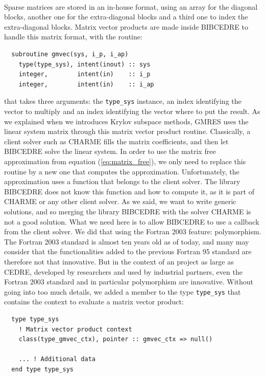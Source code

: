       \paragraph{}
      Sparse matrices are stored in an in-house format, using an array for the diagonal blocks, another one for the extra-diagonal blocks and a third one to index the extra-diagonal blocks.
      Matrix vector products are made inside BIBCEDRE to handle this matrix format, with the routine:
\begin{verbatim}
  subroutine gmvec(sys, i_p, i_ap)
    type(type_sys), intent(inout) :: sys
    integer,        intent(in)    :: i_p
    integer,        intent(in)    :: i_ap
\end{verbatim}
      that takes three arguments: the \texttt{type_sys} instance, an index identifying the vector to multiply and an index identifying the vector where to put the result.
      As we explained when we introduces Krylov subspace methods, GMRES uses the linear system matrix through this matrix vector product routine.
      Classically, a client solver such as CHARME fills the matrix coefficients, and then let BIBCEDRE solve the linear system.
      In order to use the matrix free approximation from equation (\ref{eq:matrix_free}), we only need to replace this routine by a new one that computes the approximation.
      Unfortunately, the approximation uses a function that belongs to the client solver.
      The library BIBCEDRE does not know this function and how to compute it, as it is part of CHARME or any other client solver.
      As we said, we want to write generic solutions, and so merging the library BIBCEDRE with the solver CHARME is not a good solution.
      What we need here is to allow BIBCEDRE to use a callback from the client solver.
      We did that using the Fortran 2003 feature: polymorphism.
      The Fortran 2003 standard is almost ten years old as of today, and many may consider that the functionalities added to the previous Fortran 95 standard are therefore not that innovative.
      But in the context of an project as large as CEDRE, developed by researchers and used by industrial partners, even the Fortran 2003 standard and in particular polymorphism are innovative.
      Without going into too much details, we added a member to the type \texttt{type_sys} that contains the context to evaluate a matrix vector product:
\begin{verbatim}
  type type_sys
    ! Matrix vector product context
    class(type_gmvec_ctx), pointer :: gmvec_ctx => null()

    ... ! Additional data
  end type type_sys
\end{verbatim}
